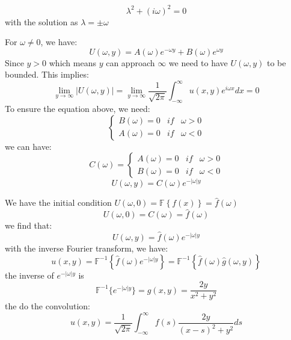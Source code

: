 \documentclass[12pt]{article} %
\begin{document}
$$
\lambda^2 + (i\omega)^{2} = 0
$$ with the solution as $ \lambda = \pm \omega$\par
For $\omega \neq 0$, we have:
$$
U(\omega, y) = A(\omega) e^{-\omega y} + B(\omega) e^{\omega y}
$$
Since $y > 0$ which means $y$ can approach $\infty$ we need to have $U(\omega, y)$ to be bounded.
This implies:
$$
\lim_{y \to \infty} |U(\omega, y)| = \lim_{y \to \infty}  \frac{1}{\sqrt{2 \pi}} \int_{-\infty}^{\infty} u(x, y) e^{i \omega x} dx = 0
$$
To ensure the equation above, we need:
$$
\left\{
\begin{array}{lll}
B(\omega) = 0 & if & \omega >0 \\
A(\omega) = 0 & if & \omega < 0
\end{array}\right.
$$
we can have:
$$
C(\omega)
=
\left\{
\begin{array}{lll}
A(\omega) = 0 & if & \omega >0 \\
B(\omega) = 0 & if & \omega < 0
\end{array}\right.
$$
$$
U(\omega, y) = C(\omega) e^{- |{\omega}| y} 
$$\par
We have the initial condition $U(\omega, 0) = \mathbb{F}\left\{f(x) \right\} = \hat{f}(\omega)$
$$
U(\omega, 0) = C(\omega) =  \hat{f}(\omega)
$$
we find that:
$$
U(\omega, y) = \hat{f}(\omega) e^{- |{\omega}| y} 
$$with the inverse Fourier transform, we have:
$$
u(x, y) = \mathbb{F}^{-1} \left\{ \hat{f}(\omega) e^{- |{\omega}| y}  \right\} = \mathbb{F}^{-1} \left\{ \hat{f}(\omega) \hat{g}(\omega, y)  \right\}$$
the inverse of $e^{- |{\omega}| y}$ is
$$
 \mathbb{F}^{-1}\{ e^{- |{\omega}| y} \} = g(x, y) = \frac{2y}{x^2+y^2}
$$
the 
do the convolution:
$$
u(x, y) = \frac{1}{\sqrt{2\pi}} \int_{-\infty}^{\infty} f(s) \frac{2y}{(x-s)^{2}+y^2}ds
$$
\end{document}
